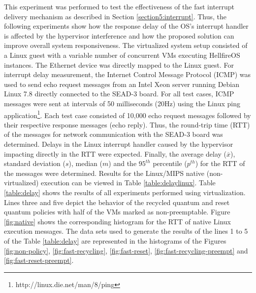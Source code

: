 This experiment was performed to test the effectiveness of the fast interrupt delivery mechanism as described in Section \ref{section5:interrupt}. Thus, the following experiments show how the response delay of the OS's interrupt handler is affected by the hypervisor interference and how the proposed solution can improve overall system responsiveness. The virtualized system setup consisted of a Linux guest with a variable number of concurrent VMs executing HellfireOS instances. The Ethernet device was directly mapped to the Linux guest. For interrupt delay measurement, the Internet Control Message Protocol (ICMP) was used to send echo request messages from an Intel Xeon server running Debian Linux 7.8 directly connected to the SEAD-3 board. For all test cases, ICMP messages were sent at intervals of 50 milliseconds (20Hz) using the Linux ping application\footnote{http://linux.die.net/man/8/ping}. Each test case consisted of 10,000 echo request messages followed by their respective response messages (echo reply). Thus, the round-trip time (RTT) \cite{tanenbaum2011} of the messages for network communication with the SEAD-3 board was determined. Delays in the Linux interrupt handler caused by the hypervisor impacting directly in the RTT were expected. Finally, the average delay ($\overline{x}$), standard deviation ($s$), median ($m$) and the $95^{th}$ percentile ($p^{th}$) for the RTT of the messages were determined. Results for the Linux/MIPS native (non-virtualized) execution can be viewed in Table \ref{table:delaylinux}. Table \ref{table:delay} shows the results of all experiments performed using virtualization. Lines three and five depict the behavior of the recycled quantum and reset quantum policies with half of the VMs marked as non-preemptable. Figure \ref{fig:native} shows the corresponding histogram for the RTT of native Linux execution messages. The data sets used to generate the results of the lines 1 to 5 of the Table \ref{table:delay} are represented in the histograms of the Figures \ref{fig:non-policy}, \ref{fig:fast-recycling}, \ref{fig:fast-reset}, \ref{fig:fast-recycling-preempt} and \ref{fig:fast-reset-preempt}.


